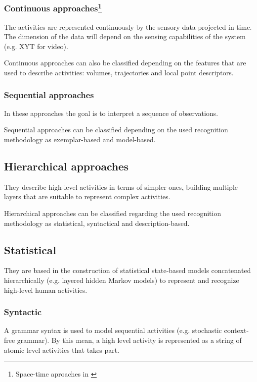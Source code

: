 \documentclass[a4paper, 12pt, openany, oneside]{book}
\begin{document}
\subsubsection{Continuous approaches\footnote{Space-time aproaches in \citep{Aggarwal11_HumanActivity}}} %
The activities are represented continuously  by the sensory data projected in time. The dimension of the data will depend on the sensing capabilities of the system (e.g. XYT for video).

Continuous approaches can also be classified depending on the features that are used to describe activities: volumes, trajectories and local point descriptors.


\subsubsection{Sequential approaches} %
In these approaches the goal is to interpret a sequence of observations.

Sequential approaches can be classified depending on the used recognition methodology as exemplar-based and model-based.


\subsection{Hierarchical approaches}
They describe high-level activities in terms of simpler ones, building multiple layers that are suitable to represent complex activities.

Hierarchical approaches can be classified regarding the used recognition methodology as statistical, syntactical and description-based.

\subsection{Statistical}
They are based in the construction of statistical state-based models concatenated hierarchically (e.g. layered hidden Markov models) to represent and recognize high-level human activities.

\subsubsection{Syntactic}
A grammar syntax is used to model sequential activities (e.g. stochastic context-free grammar). By this mean, a high level activity is represented as a string of atomic level activities that takes part.
\end{document}
